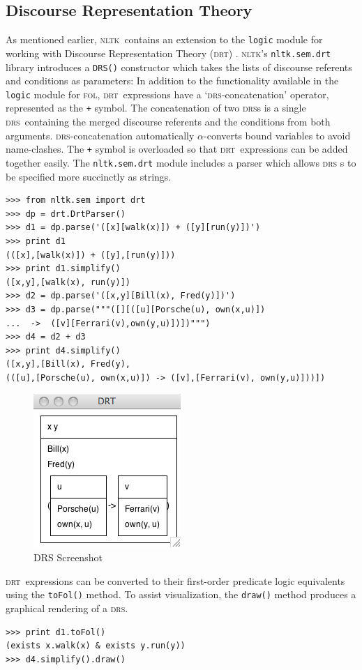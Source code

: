 \documentclass[11pt, a4paper]{article}
\newcommand{\DRS}{\textsc{drs}}
\newcommand{\DRT}{\textsc{drt}}
\newcommand{\FOL}{\textsc{fol}}
\newcommand{\NLTK}{\textsc{nltk}}
\begin{document}
\subsection{Discourse Representation Theory}
As mentioned earlier, \NLTK\ contains an extension to the
\texttt{logic} module for working with Discourse Representation
Theory (\DRT) \citep{KampReyle}.  \NLTK's \texttt{nltk.sem.drt}
library introduces a \texttt{DRS()} constructor which takes the lists
of discourse referents and conditions as parameters:
In addition to the functionality available in the
\texttt{logic} module for \FOL, \DRT\ expressions have a
`\DRS-concatenation' operator, represented as the \texttt{+} symbol.
The concatenation of two \DRS s is a single \DRS\ containing the
merged discourse referents and the conditions from both arguments.
\DRS-concatenation automatically $\alpha$-converts bound variables to
avoid name-clashes.  The \texttt{+} symbol is overloaded so that \DRT\
expressions can be added together easily. 
The \texttt{nltk.sem.drt} module includes a parser which allows \DRS
s to be specified more succinctly as strings.
\begin{Verbatim}
>>> from nltk.sem import drt
>>> dp = drt.DrtParser()
>>> d1 = dp.parse('([x][walk(x)]) + ([y][run(y)])')
>>> print d1
(([x],[walk(x)]) + ([y],[run(y)]))
>>> print d1.simplify()
([x,y],[walk(x), run(y)])
>>> d2 = dp.parse('([x,y][Bill(x), Fred(y)])')
>>> d3 = dp.parse("""([][([u][Porsche(u), own(x,u)])
...  ->  ([v][Ferrari(v),own(y,u)])])""")
>>> d4 = d2 + d3
>>> print d4.simplify()
([x,y],[Bill(x), Fred(y),
(([u],[Porsche(u), own(x,u)]) -> ([v],[Ferrari(v), own(y,u)]))])
\end{Verbatim}

\begin{figure}
\vspace{-5ex}
\begin{center}
   \includegraphics[scale=.5]{drs.png}

 \end{center}
\vspace{-4ex}
\caption{DRS Screenshot} 
\vspace{-5ex}
\end{figure}
\noindent
\DRT\ expressions can be converted to their first-order predicate
logic equivalents using the \texttt{toFol()} method. To assist
visualization, the \texttt{draw()} method produces a graphical
rendering of a \DRS.
\begin{Verbatim}[frame=none]
>>> print d1.toFol()
(exists x.walk(x) & exists y.run(y))
>>> d4.simplify().draw()
\end{Verbatim}
\end{document}
